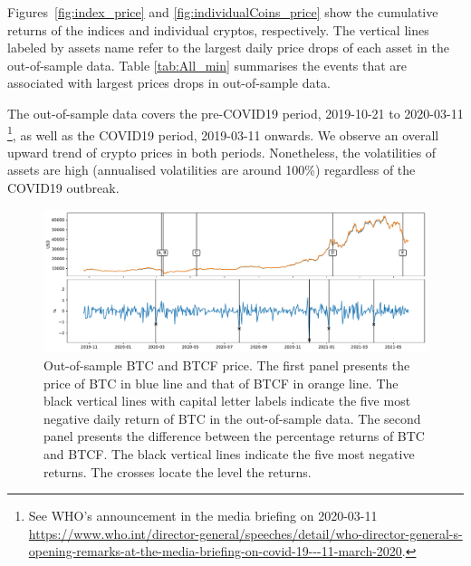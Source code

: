 Figures~\ref{fig:index_price} and \ref{fig:individualCoins_price} show
the cumulative returns of the indices and individual cryptos,
respectively.  The vertical lines labeled by assets name refer to the 
largest daily price drops of each asset in the out-of-sample data.  
Table \ref{tab:All_min} summarises the events that are associated with largest prices drops in 
out-of-sample data. 

The out-of-sample data covers the pre-COVID19 period, 2019-10-21 to
2020-03-11 \footnote{See WHO's announcement in the media briefing on 2020-03-11 \url{https://www.who.int/director-general/speeches/detail/who-director-general-s-opening-remarks-at-the-media-briefing-on-covid-19---11-march-2020}.}, as well as the COVID19 period, 2019-03-11 onwards. 
We observe an overall upward trend of crypto prices in both periods.
Nonetheless, the volatilities of assets are high (annualised volatilities are around
100\%) regardless of the COVID19 outbreak. 

\newpage
\begin{figure}[t]
\includegraphics[width=\textwidth]{_pics/BTC_price.pdf}
  \caption{Out-of-sample BTC and BTCF price. The first panel presents the price of BTC in blue line and that of BTCF in orange line.
  The black vertical lines with capital letter labels indicate the five most negative daily return of BTC in the out-of-sample data.
  The second panel presents the difference between the percentage returns of BTC and BTCF.
  The black vertical lines indicate the five most negative returns.
  The crosses locate the level the returns.}
\label{fig:BTC_price}
\end{figure}

